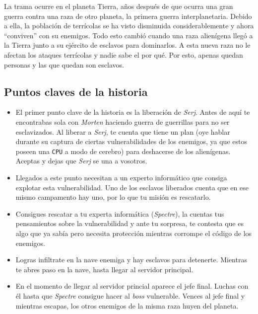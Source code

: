 \documentclass[11pt, twoside]{article}
\begin{document}
La trama ocurre en el planeta Tierra, años después de que ocurra una gran guerra contra una raza de otro planeta, la primera guerra interplanetaria. Debido a ella, la población de terrícolas se ha visto disminuida considerablemente y ahora ``conviven'' con su enemigos. Todo esto cambió cuando una raza alienígena llegó a la Tierra junto a su ejército de esclavos para dominarlos. A esta nueva raza no le afectan los ataques terrícolas y nadie sabe el por qué. Por esto, apenas quedan personas y las que quedan son esclavos. 

\subsection{Puntos claves de la historia}

\begin{itemize}
\item El primer punto clave de la historia es la liberación de \textit{Serj}. Antes de aquí te encontrabas sola con \textit{Morten} haciendo guerra de guerrillas para no ser esclavizados. Al liberar a \textit{Serj}, te cuenta que tiene un plan (oye hablar durante su captura de ciertas vulnerabilidades de los enemigos, ya que estos poseen una \texttt{CPU} a modo de cerebro) para deshacerse de los alienígenas. Aceptas y dejas que \textit{Serj} se una a vosotros.
\item Llegados a este punto necesitan a un experto informático que consiga explotar esta vulnerabilidad. Uno de los esclavos liberados cuenta que en ese mismo campamento hay uno, por lo que tu misión es rescatarlo. 
\item Consigues rescatar a tu experta informática (\textit{Spectre}), la cuentas tus pensamientos sobre la vulnerabilidad y ante tu sorpresa, te contesta que es algo que ya sabía pero necesita protección mientras corrompe el código de los enemigos. 
\item Logras infiltrate en la nave enemiga y hay esclavos para detenerte. Mientras te abres paso en la nave, hasta llegar al servidor principal. 
\item En el momento de llegar al servidor princial aparece el jefe final. Luchas con él hasta que \textit{Spectre} consigue hacer al \textit{boss} vulnerable. Vences al jefe final y mientras escapas, los otros enemigos de la misma raza huyen del planeta. 
\end{itemize}
\end{document}
